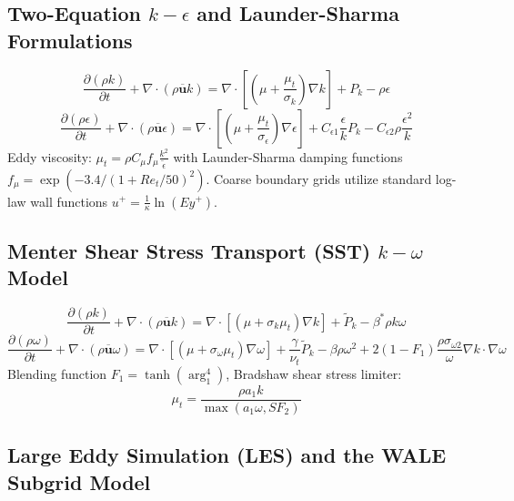 \documentclass[11pt,a4paper]{article}
\begin{document}
\subsection{Two-Equation $k-\epsilon$ and Launder-Sharma Formulations}
\label{subsec:k-epsilon}

\begin{equation}
\frac{\partial (\rho k)}{\partial t} + \nabla \cdot (\rho \overline{\mathbf{u}} k) = \nabla \cdot \left[ \left( \mu + \frac{\mu_t}{\sigma_k} \right) \nabla k \right] + P_k - \rho \epsilon
\end{equation}
\begin{equation}
\frac{\partial (\rho \epsilon)}{\partial t} + \nabla \cdot (\rho \overline{\mathbf{u}} \epsilon) = \nabla \cdot \left[ \left( \mu + \frac{\mu_t}{\sigma_\epsilon} \right) \nabla \epsilon \right] + C_{\epsilon 1} \frac{\epsilon}{k} P_k - C_{\epsilon 2} \rho \frac{\epsilon^2}{k}
\end{equation}
Eddy viscosity: $\mu_t = \rho C_\mu f_\mu \frac{k^2}{\tilde{\epsilon}}$ with Launder-Sharma damping functions $f_\mu = \exp(-3.4 / (1 + Re_t/50)^2)$. Coarse boundary grids utilize standard log-law wall functions $u^+ = \frac{1}{\kappa}\ln(E y^+)$.

\subsection{Menter Shear Stress Transport (SST) $k-\omega$ Model}
\label{subsec:menter-sst}

\begin{equation}
\frac{\partial (\rho k)}{\partial t} + \nabla \cdot (\rho \overline{\mathbf{u}} k) = \nabla \cdot \left[ \left( \mu + \sigma_k \mu_t \right) \nabla k \right] + \tilde{P}_k - \beta^* \rho k \omega
\end{equation}
\begin{equation}
\frac{\partial (\rho \omega)}{\partial t} + \nabla \cdot (\rho \overline{\mathbf{u}} \omega) = \nabla \cdot \left[ \left( \mu + \sigma_\omega \mu_t \right) \nabla \omega \right] + \frac{\gamma}{\nu_t} \tilde{P}_k - \beta \rho \omega^2 + 2 (1 - F_1) \frac{\rho \sigma_{\omega 2}}{\omega} \nabla k \cdot \nabla \omega
\end{equation}
Blending function $F_1 = \tanh(\arg_1^4)$, Bradshaw shear stress limiter:
\begin{equation}
\mu_t = \frac{\rho a_1 k}{\max(a_1 \omega, S F_2)}
\end{equation}

\subsection{Large Eddy Simulation (LES) and the WALE Subgrid Model}
\label{subsec:les-wale}
\end{document}
